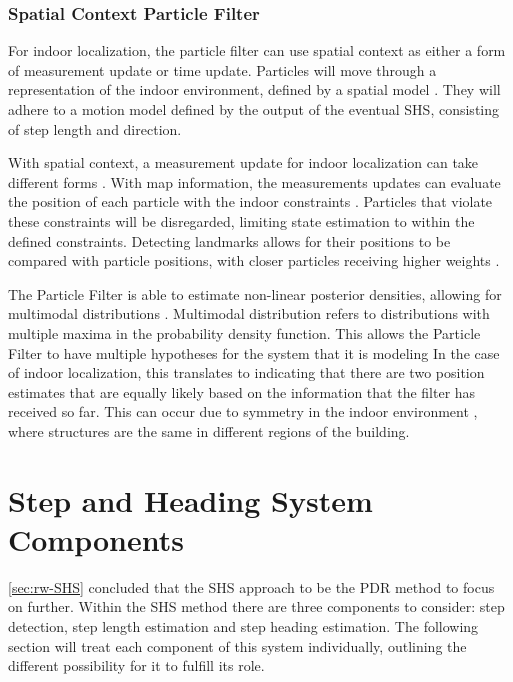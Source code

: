 \subsubsection{Spatial Context Particle Filter}
For indoor localization, the particle filter can use spatial context as either a form of measurement update or time update. Particles will move through a representation of the indoor environment, defined by a spatial model \cite{kihlberg2012map, Qian2015}. They will adhere to a motion model defined by the output of the eventual \ac{SHS}, consisting of step length and direction.\par 

With spatial context, a measurement update for indoor localization can take different forms \cite{Gu2019}. With map information, the measurements updates can evaluate the position of each particle with the indoor constraints \cite{Qian2015}. Particles that violate these constraints will be disregarded, limiting state estimation to within the defined constraints. Detecting landmarks allows for their positions to be compared with particle positions, with closer particles receiving higher weights \cite{Shang2015}.  \par 

The Particle Filter is able to estimate non-linear posterior densities, allowing for multimodal distributions \cite{gustafsson2010particle,kihlberg2012map}. Multimodal distribution refers to distributions with multiple maxima in the probability density function. This allows the Particle Filter to have multiple hypotheses for the system that it is modeling In the case of indoor localization, this translates to indicating that there are two position estimates that are equally likely based on the information that the filter has received so far. This can occur due to symmetry in the indoor environment  \cite{Woodman2008}, where structures are the same in different regions of the building.


\newpage
\section{Step and Heading System Components}
\label{sec:shs_components}

\cref{sec:rw-SHS} concluded that the \ac{SHS} approach to be the \ac{PDR} method to focus on further. Within the \ac{SHS} method there are three components to consider: step detection, step length estimation and step heading estimation. The following section will treat each component of this system individually, outlining the different possibility for it to fulfill its role. \par 

